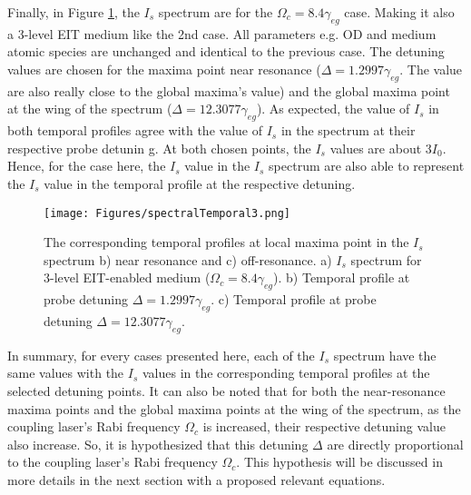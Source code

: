 Finally, in Figure \ref{fig: corresponding temporal profile 3}, the $I_{s}$ spectrum are for the $\Omega_{c} = 8.4\gamma_{eg}$ case. Making it also a 3-level EIT medium like the 2nd case. All parameters e.g. OD and medium atomic species are unchanged and identical to the previous case. The detuning values are chosen for the maxima point near resonance ($\Delta = 1.2997\gamma_{eg}$. The value are also really close to the global maxima's value) and the global maxima point at the wing of the spectrum ($\Delta = 12.3077\gamma_{eg}$). As expected, the value of $I_{s}$ in both temporal profiles agree with the value of $I_{s}$ in the spectrum at their respective probe detunin  g. At both chosen points, the $I_{s}$ values are about $3I_{0}$. Hence, for the case here, the $I_{s}$ value in the $I_{s}$ spectrum are also able to represent the $I_{s}$ value in the temporal profile at the respective detuning.

\begin{figure}
    \centering
    \texttt{[image: Figures/spectralTemporal3.png]}
    \caption{The corresponding temporal profiles at local maxima point in the $I_{s}$ spectrum b) near resonance and c) off-resonance. a) $I_{s}$ spectrum for 3-level EIT-enabled medium ($\Omega_{c} = 8.4\gamma_{eg}$). b) Temporal profile at probe detuning $\Delta = 1.2997\gamma_{eg}$. c) Temporal profile at probe detuning $\Delta = 12.3077\gamma_{eg}$.}
    \label{fig: corresponding temporal profile 3}
\end{figure}

In summary, for every cases presented here, each of the $I_{s}$ spectrum have the same values with the $I_{s}$ values in the corresponding temporal profiles at the selected detuning points. It can also be noted that for both the near-resonance maxima points and the global maxima points at the wing of the spectrum, as the coupling laser's Rabi frequency $\Omega_{c}$ is increased, their respective detuning value also increase. So, it is hypothesized that this detuning $\Delta$ are directly proportional to the coupling laser's Rabi frequency $\Omega_{c}$. This hypothesis will be discussed in more details in the next section with a proposed relevant equations.


